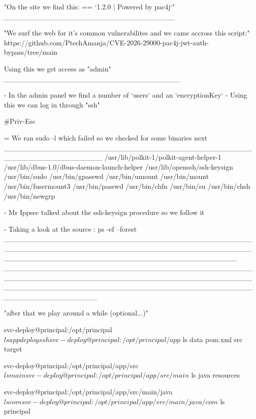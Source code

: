 {"On the site we find this: 
  == `1.2.0 | Powered by pac4j`"
_________________________________

      "We surf the web for it's common vulnerabilites and we came accross this script:"
          https://github.com/PtechAmanja/CVE-2026-29000-pac4j-jwt-auth-bypass/tree/main

Using this we get access as "admin"
__________________________________

- In the admin panel we find a number of `users` and an `encryptionKey`
    - Using this we can log in through "ssh" 


#Priv-Esc

            = We ran sudo -l which failed so we checked for some binaries next
            ___________________________________________________________________
            /usr/lib/polkit-1/polkit-agent-helper-1
            /usr/lib/dbus-1.0/dbus-daemon-launch-helper
            /usr/lib/openssh/ssh-keysign
            /usr/bin/sudo
            /usr/bin/gpasswd
            /usr/bin/umount
            /usr/bin/mount
            /usr/bin/fusermount3
            /usr/bin/passwd
            /usr/bin/chfn
            /usr/bin/su
            /usr/bin/chsh
            /usr/bin/newgrp
            
            - Mr Ippsec talked about the ssh-keysign procedure so we follow it 

- Taking a look at the source : ps -ef --forest
_____________________________________________________________________________________________________________________________________________
__________________________________________________________________________________________________________________________________________________________________


"after that we play around a while (optional...)"
          
          svc-deploy@principal:/opt/principal$ ls
          app  deploy  ssh

          svc-deploy@principal:/opt/principal/app$ ls
          data  pom.xml  src  target
 
          svc-deploy@principal:/opt/principal/app/src$ ls
          main

          svc-deploy@principal:/opt/principal/app/src/main$ ls
          java  resources

          svc-deploy@principal:/opt/principal/app/src/main/java$ ls
          com

          svc-deploy@principal:/opt/principal/app/src/main/java/com$ ls
          principal

}
